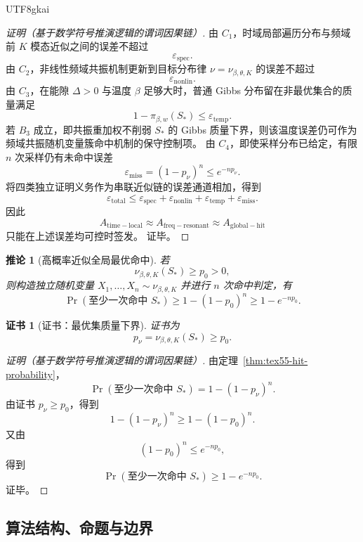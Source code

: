 \documentclass[12pt]{article}
\newtheorem{corollary}{推论}[section]
\newtheorem{Certificate}{证书}[section]
\begin{document}
\begin{CJK*}{UTF8}{gkai}
\begin{proof}[证明（基于数学符号推演逻辑的谓词因果链）]
由 \(C_1\)，时域局部遍历分布与频域前 \(K\) 模态近似之间的误差不超过
\[
  \varepsilon_{\mathrm{spec}}.
\]
由 \(C_2\)，非线性频域共振机制更新到目标分布律 \(\nu=\nu_{\beta,\theta,K}\) 的误差不超过
\[
  \varepsilon_{\mathrm{nonlin}}.
\]
由 \(C_3\)，在能隙 \(\Delta>0\) 与温度 \(\beta\) 足够大时，普通 Gibbs 分布留在非最优集合的质量满足
\[
  1-\pi_{\beta,w}(S_*)
  \le
  \varepsilon_{\mathrm{temp}}.
\]
若 \(B_3\) 成立，即共振重加权不削弱 \(S_*\) 的 Gibbs 质量下界，则该温度误差仍可作为频域共振随机变量簇命中机制的保守控制项。
由 \(C_4\)，即使采样分布已给定，有限 \(n\) 次采样仍有未命中误差
\[
  \varepsilon_{\mathrm{miss}}
  =
  (1-p_{\nu})^n
  \le
  e^{-np_{\nu}}.
\]
将四类独立证明义务作为串联近似链的误差通道相加，得到
\[
  \varepsilon_{\mathrm{total}}
  \le
  \varepsilon_{\mathrm{spec}}
  +
  \varepsilon_{\mathrm{nonlin}}
  +
  \varepsilon_{\mathrm{temp}}
  +
  \varepsilon_{\mathrm{miss}}.
\]
因此
\[
  \boxed{
  A_{\mathrm{time-local}}
  \approx
  A_{\mathrm{freq-resonant}}
  \approx
  A_{\mathrm{global-hit}}
  }
\]
只能在上述误差均可控时签发。
证毕。
\end{proof}

\begin{corollary}[高概率近似全局最优命中]
\label{cor:tex55-high-probability-hit}
若
\[
  \nu_{\beta,\theta,K}(S_*)\ge p_0>0,
\]
则构造独立随机变量 \(X_1,\ldots,X_n\sim\nu_{\beta,\theta,K}\) 并进行 \(n\) 次命中判定，有
\[
  \Pr(\text{至少一次命中 }S_*)
  \ge
  1-(1-p_0)^n
  \ge
  1-e^{-np_0}.
\]
\end{corollary}

\begin{Certificate}[证书：最优集质量下界]
\label{cert:tex55-high-probability-hit}
证书为
\[
  p_{\nu}=\nu_{\beta,\theta,K}(S_*)\ge p_0.
\]
\end{Certificate}

\begin{proof}[证明（基于数学符号推演逻辑的谓词因果链）]
由定理~\ref{thm:tex55-hit-probability}，
\[
  \Pr(\text{至少一次命中 }S_*)
  =
  1-(1-p_{\nu})^n.
\]
由证书 \(p_{\nu}\ge p_0\)，得到
\[
  1-(1-p_{\nu})^n
  \ge
  1-(1-p_0)^n.
\]
又由
\[
  (1-p_0)^n\le e^{-np_0},
\]
得到
\[
  \Pr(\text{至少一次命中 }S_*)
  \ge
  1-e^{-np_0}.
\]
证毕。
\end{proof}

\subsection{算法结构、命题与边界}
\label{subsec:tex55-algorithm-boundaries}


\end{CJK*}
\end{document}
